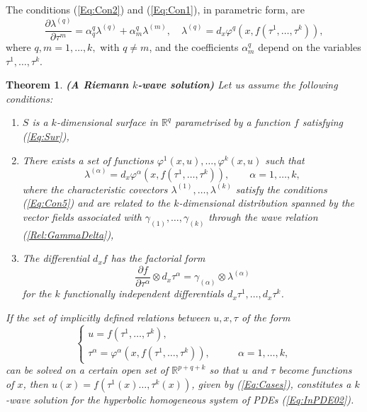 \documentclass{birkjour}
\newtheorem{thm}{Theorem}[section]
\theoremstyle{definition}
\theoremstyle{remark}
\numberwithin{equation}{section}
\numberwithin{equation}{section}
\numberwithin{thm}{section}
\numberwithin{equation}{section}
\numberwithin{thm}{section}
\begin{document}
The conditions (\ref{Eq:Con2}) and (\ref{Eq:Con1}), in parametric form, are
\begin{equation}
	\label{Eq:Con5}
	\frac{\partial \lambda^{(q)}}{\partial \tau^m}=\alpha_q^q\lambda^{(q)}+\alpha_m^{q}\lambda^{(m)},\quad \lambda^{(q)}=d_x\varphi^q(x,f(\tau^1,\ldots,\tau^k)),
\end{equation}
where $q,m=1,\ldots,k,$ with $q\neq m$, and the coefficients $\alpha^q_m$ depend on the variables $\tau^1,\ldots,\tau^k$. %

\begin{thm}\label{Th:primer} {\bf (A Riemann $k$-wave solution)} Let us assume the following conditions:
	\begin{enumerate}
		\item  $S$ is a $k$-dimensional surface in $\mathbb{R}^q$ parametrised by a function $f$ satisfying  (\ref{Eq:Sur}),
		\item  There exists a set of functions $\varphi^1(x,u),\ldots,\varphi^k(x,u)$ such that
		\begin{equation}
			\label{eq:0}
			\lambda^{(\alpha)}=d_x\varphi^\alpha(x,f(\tau^1,\ldots,\tau^k)),\qquad \alpha=1,\ldots,k,
		\end{equation}
		where the characteristic covectors $\lambda^{(1)},\ldots,\lambda^{(k)}$ satisfy the conditions (\ref{Eq:Con5}) and are related to the $k$-dimensional distribution spanned by the vector fields associated with $\gamma_{(1)},\ldots,\gamma_{(k)}$ through the wave relation (\ref{Rel:GammaDelta}),
		\item The differential $d_xf$ has the factorial form 
		\begin{equation}
			\label{eq:00}
			\frac{\partial f}{\partial \tau^\alpha}\otimes d_x\tau^\alpha=\gamma_{(\alpha)}\otimes \lambda^{(\alpha)}
		\end{equation}
		for the $k$ functionally independent differentials $d_x\tau^1,\ldots, d_x\tau^k$.
		
	\end{enumerate}
	If the set of implicitly defined relations between $u,x,\tau$ of the form
	\begin{equation}\label{Eq:Cases}
		\begin{cases}
			u=f(\tau^1,\ldots,\tau^k),\\
			\tau^\alpha=\varphi^\alpha(x,f(\tau^1,\ldots,\tau^k)),\qquad& \alpha=1,\ldots,k,
		\end{cases}
	\end{equation}
	can be solved on a certain open set of $\mathbb{R}^{p+q+k}$ so that $u$ and $\tau$ become functions of $x$, then  $u(x)=f(\tau^1(x)\ldots,\tau^k(x))$, given by (\ref{Eq:Cases}), constitutes a $k$-wave solution for the hyperbolic homogeneous system of PDEs (\ref{Eq:InPDE02}).
\end{thm}
\end{document}
